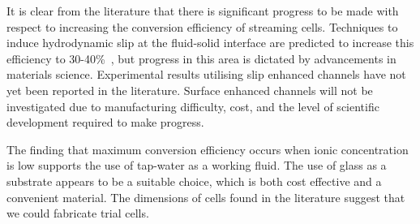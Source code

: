   It is clear from the literature that there is significant progress to be made with respect to increasing the conversion efficiency of streaming cells.
  Techniques to induce hydrodynamic slip at the fluid-solid interface are predicted to increase this efficiency to 30-40\%~\cite{Davidson2008a, Ren2008}, but progress in this area is dictated by advancements in materials science.
  Experimental results utilising slip enhanced channels have not yet been reported in the literature.
  Surface enhanced channels will not be investigated due to manufacturing difficulty, cost, and the level of scientific development required to make progress.

  The finding that maximum conversion efficiency occurs when ionic concentration is low supports the use of tap-water as a working fluid.
  The use of glass as a substrate appears to be a suitable choice, which is both cost effective and a convenient material.
  The dimensions of cells found in the literature suggest that we could fabricate trial cells.
